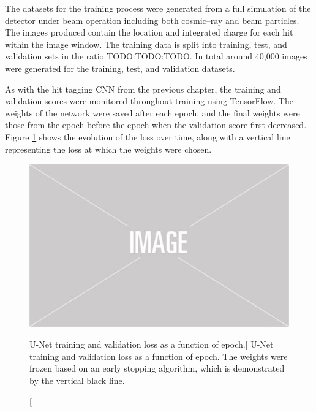 The datasets for the training process were generated from a full simulation of 
the \protodune{} detector under beam operation including both cosmic--ray and
beam particles. The images produced contain the location and integrated charge
for each hit within the image window. The training data is split into training, 
test, and validation sets in the ratio TODO:TODO:TODO. In total around 40,000 
images were generated for the training, test, and validation datasets.

As with the hit tagging CNN from the previous chapter, the training and
validation scores were monitored throughout training using TensorFlow. The
weights of the network were saved after each epoch, and the final weights were
those from the epoch before the epoch when the validation score first decreased.
Figure \ref{fig:unet_loss} shows the evolution of the loss over time, along with
a vertical line representing the loss at which the weights were chosen.
\begin{figure}
	\centering
	\includegraphics[width=\textwidth]{figures/placeholder.png}
	\caption
	[U-Net training and validation loss as a function of epoch.]
	{U-Net training and validation loss as a function of epoch. The weights were
	frozen based on an early stopping algorithm, which is demonstrated by the
	vertical black line.}
	\label{fig:unet_loss}
\end{figure}

